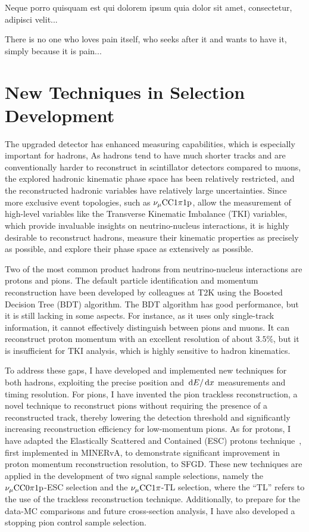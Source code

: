 \begin{savequote}[8cm]
\textlatin{Neque porro quisquam est qui dolorem ipsum quia dolor sit amet, consectetur, adipisci velit...}

There is no one who loves pain itself, who seeks after it and wants to have it, simply because it is pain...
\end{savequote}

\chapter{\label{ch:techniques}New Techniques in Selection Development} 
\minitoc

The upgraded detector has enhanced measuring capabilities, which is especially important for hadrons,
As hadrons tend to have much shorter tracks and are conventionally harder to reconstruct in scintillator detectors compared to muons, the explored hadronic kinematic phase space has been relatively restricted, and the reconstructed hadronic variables have relatively large uncertainties.
Since more exclusive event topologies, such as $\nu_{\mu}\textrm{CC}1\pi1\textrm{p}$, allow the measurement of high-level variables like the Transverse Kinematic Imbalance (TKI) variables, which provide invaluable insights on neutrino-nucleus interactions, it is highly desirable to reconstruct hadrons, measure their kinematic properties as precisely as possible, and explore their phase space as extensively as possible.

Two of the most common product hadrons from neutrino-nucleus interactions are protons and pions. 
The default particle identification and momentum reconstruction have been developed by colleagues at T2K using the Boosted Decision Tree (BDT) algorithm. The BDT algorithm has good performance, but it is still lacking in some aspects.
For instance, as it uses only single-track information, it cannot effectively distinguish between pions and muons. 
It can reconstruct proton momentum with an excellent resolution of about $3.5\%$, but it is insufficient for TKI analysis, which is highly sensitive to hadron kinematics. 

To address these gaps, I have developed and implemented new techniques for both hadrons, exploiting the precise position and $\,\textrm{d}E/\,\textrm{d}x$ measurements and timing resolution.
For pions, I have invented the pion trackless reconstruction, a novel technique to reconstruct pions without requiring the presence of a reconstructed track, thereby lowering the detection threshold and significantly increasing reconstruction efficiency for low-momentum pions. 
As for protons, I have adapted the Elastically Scattered and Contained (ESC) protons technique~\cite{Lu:2016mjf}, first implemented in MINERvA, to demonstrate significant improvement in proton momentum reconstruction resolution, to SFGD. 
These new techniques are applied in the development of two signal sample selections, namely the $\nu_{\mu}\textrm{CC}0\pi1\textrm{p}$-ESC selection and the $\nu_{\mu}\textrm{CC}1\pi$-TL selection, where the ``TL'' refers to the use of the trackless reconstruction technique.
Additionally, to prepare for the data-MC comparisons and future cross-section analysis, I have also developed a stopping pion control sample selection.

